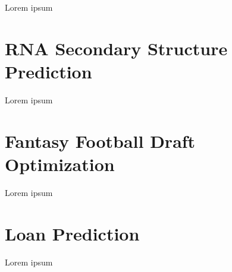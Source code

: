 \label{chapter:use-cases}

Lorem ipsum

\section{RNA Secondary Structure Prediction}
\label{sect:use-cases--rna-secondary-structure-prediction}

Lorem ipsum

\section{Fantasy Football Draft Optimization}
\label{sect:use-cases--fantasy-football-draft-otpimization}

Lorem ipsum

\section{Loan Prediction}
\label{sect:use-cases--loan-prediction}

Lorem ipsum
